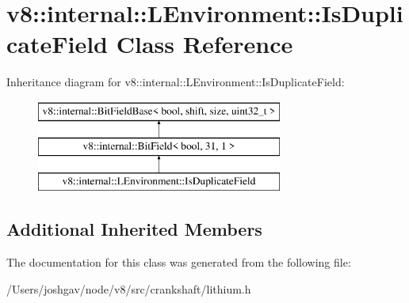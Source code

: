 \hypertarget{classv8_1_1internal_1_1_l_environment_1_1_is_duplicate_field}{}\section{v8\+:\+:internal\+:\+:L\+Environment\+:\+:Is\+Duplicate\+Field Class Reference}
\label{classv8_1_1internal_1_1_l_environment_1_1_is_duplicate_field}
Inheritance diagram for v8\+:\+:internal\+:\+:L\+Environment\+:\+:Is\+Duplicate\+Field\+:\begin{figure}[H]
\begin{center}
\leavevmode
\includegraphics[height=3.000000cm]{classv8_1_1internal_1_1_l_environment_1_1_is_duplicate_field}
\end{center}
\end{figure}
\subsection*{Additional Inherited Members}


The documentation for this class was generated from the following file\+:\begin{DoxyCompactItemize}
\item 
/\+Users/joshgav/node/v8/src/crankshaft/lithium.\+h\end{DoxyCompactItemize}
